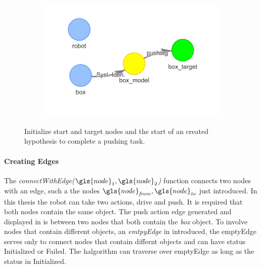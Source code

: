 \begin{figure}[H]
\begin{subfigure}{.3\textwidth}
    \caption{}\label{subfig:robot_push_2}
    \end{subfigure}
    \begin{subfigure}{.3\textwidth}
    \includegraphics[width=1.1\textwidth]{figures/proposed_method/connecting_nodes/robot_push/robot_push_2}
    \caption{}\label{subfig:robot_push_3}
    \end{subfigure}
    \caption{Initialize start and target nodes and the start of an created hypothesis to complete a pushing task.}%
    \label{fig:robot_push_1}
\end{figure}

\paragraph{Creating Edges}
The \textit{connectWithEdge($\gls{node}_1, \gls{node}_2$)} function connects two nodes with an edge, such a the nodes $\gls{node}_\mathit{from}, \gls{node}_\mathit{to}$ just introduced. In this thesis the robot can take two actions, drive and push. It is required that both nodes contain the same object. The push action edge generated and displayed in  is between two nodes that both contain the \textit{box} object. To involve nodes that contain different objects, an \textit{emtpyEdge} in introduced, the  emptyEdge serves only to connect nodes that contain differnt objects and can have status Initialized or Failed. The \ac{halgorithm} can traverse over emptyEdge as long as the status in Initialized.\bs

